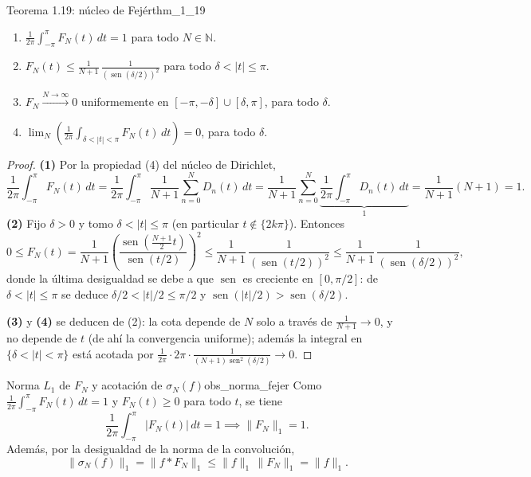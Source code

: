 \begin{teorema}{Teorema 1.19: núcleo de Fejér}{thm_1_19}
\begin{enumerate}
\item[(1)] $\displaystyle\frac{1}{2\pi}\int_{-\pi}^{\pi} F_N(t)\,dt = 1$ para todo $N \in \mathbb{N}$.
\item[(2)] $\displaystyle F_N(t) \le \frac{1}{N+1}\,\frac{1}{(\operatorname{sen}(\delta/2))^2}$ para todo $\delta < |t| \le \pi$.
\item[(3)] $F_N \xrightarrow{N\to\infty} 0$ uniformemente en $[-\pi,-\delta]\cup[\delta,\pi]$, para todo $\delta$.
\item[(4)] $\displaystyle\lim_{N}\left( \frac{1}{2\pi}\int_{\delta < |t| < \pi} F_N(t)\,dt \right) = 0$, para todo $\delta$.
\end{enumerate}
\end{teorema}

\begin{proof}
\textbf{(1)} Por la propiedad (4) del núcleo de Dirichlet,
\[
\frac{1}{2\pi}\int_{-\pi}^{\pi} F_N(t)\,dt = \frac{1}{2\pi}\int_{-\pi}^{\pi}\frac{1}{N+1}\sum_{n=0}^N D_n(t)\,dt = \frac{1}{N+1}\sum_{n=0}^N \underbrace{\frac{1}{2\pi}\int_{-\pi}^{\pi} D_n(t)\,dt}_{1} = \frac{1}{N+1}(N+1) = 1.
\]
\textbf{(2)} Fijo $\delta > 0$ y tomo $\delta < |t| \le \pi$ (en particular $t \notin \{2k\pi\}$). Entonces
\[
0 \le F_N(t) = \frac{1}{N+1}\left( \frac{\operatorname{sen}\left(\frac{N+1}{2}t\right)}{\operatorname{sen}(t/2)} \right)^2 \le \frac{1}{N+1}\,\frac{1}{(\operatorname{sen}(t/2))^2} \le \frac{1}{N+1}\,\frac{1}{(\operatorname{sen}(\delta/2))^2},
\]
donde la última desigualdad se debe a que $\operatorname{sen}$ es creciente en $[0,\pi/2]$: de $\delta < |t| \le \pi$ se deduce $\delta/2 < |t|/2 \le \pi/2$ y $\operatorname{sen}(|t|/2) > \operatorname{sen}(\delta/2)$.

\textbf{(3)} y \textbf{(4)} se deducen de (2): la cota depende de $N$ solo a través de $\frac{1}{N+1} \to 0$, y no depende de $t$ (de ahí la convergencia uniforme); además la integral en $\{\delta<|t|<\pi\}$ está acotada por $\frac{1}{2\pi}\cdot 2\pi \cdot \frac{1}{(N+1)\operatorname{sen}^2(\delta/2)} \to 0$.
\end{proof}

\begin{observacion}{Norma $L_1$ de $F_N$ y acotación de $\sigma_N(f)$}{obs_norma_fejer}
Como $\frac{1}{2\pi}\int_{-\pi}^{\pi}F_N(t)\,dt = 1$ y $F_N(t) \ge 0$ para todo $t$, se tiene
\[
\frac{1}{2\pi}\int_{-\pi}^{\pi}|F_N(t)|\,dt = 1 \implies \|F_N\|_1 = 1.
\]
Además, por la desigualdad de la norma de la convolución,
\[
\|\sigma_N(f)\|_1 = \|f * F_N\|_1 \le \|f\|_1\,\|F_N\|_1 = \|f\|_1.
\]
\end{observacion}

